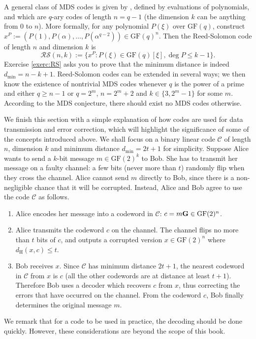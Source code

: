 \documentclass[a4paper, 11pt]{book}
\numberwithin{equation}{section}
\theoremstyle{plain}
\newcommand{\dmin}{d_{\min}}
\newcommand{\dH}{d_\mathrm{H}}
\newcommand{\GF}{\mathrm{GF}}
\renewcommand{\(}{\ldbrack}
\renewcommand{\)}{\rdbrack}
\newcommand{\BF}[1]{{\bf\boldmath{#1}\unboldmath}}
\begin{document}
A general class of MDS codes is given by \BF{Reed-Solomon codes}, defined by evaluations of polynomials, and which are $q$-ary codes of length $n = q-1$ (the dimension $k$ can be anything from $0$ to $n$). More formally, for any polynomial $P(\xi)$ over $\GF(q)$, construct $x^P := (P(1), P(\alpha), \dots, P(\alpha^{q-2})) \in \GF(q)^n$. Then the Reed-Solomon code of length $n$ and dimension $k$ is 
\[
	\mathcal{RS}(n,k) := \{ x^P : P(\xi) \in \GF(q)[\xi], \deg P \le k-1 \}.
\]
Exercise \ref{exerc:RS} asks you to prove that the minimum distance is indeed $\dmin = n - k + 1$. Reed-Solomon codes can be extended in several ways; we then know the existence of nontrivial MDS codes whenever $q$ is the power of a prime and either $q \ge n-1$ or $q = 2^m$, $n = 2^m+2$ and $k \in \{3,2^m-1\}$ for some $m$. According to the MDS conjecture, there should exist no MDS codes otherwise.



We finish this section with a simple explanation of how codes are used for data transmission and error correction, which will highlight the significance of some of the concepts introduced above. We shall focus on a binary linear code $\mathcal{C}$ of length $n$, dimension $k$ and minimum distance $\dmin = 2t+1$ for simplicity. Suppose Alice wants to send a $k$-bit message $m \in \GF(2)^k$ to Bob. She has to transmit her message on a faulty channel: a few bits (never more than $t$) randomly flip when they cross the channel. Alice cannot send $m$ directly to Bob, since there is a non-negligible chance that it will be corrupted. Instead, Alice and Bob agree to use the code $\mathcal{C}$ as follows.
\begin{enumerate}
	\item Alice encodes her message into a codeword in $\mathcal{C}$: $c = m {\bf G} \in \GF(2)^n$.
	
	\item Alice transmits the codeword $c$ on the channel. The channel flips no more than $t$ bits of $c$, and outputs a corrupted version $x \in \GF(2)^n$ where $\dH(x,c) \le t$.
	
	\item Bob receives $x$. Since $\mathcal{C}$ has minimum distance $2t+1$, the nearest codeword in $\mathcal{C}$ from $x$ is $c$ (all the other codewords are at distance at least $t+1$). Therefore Bob uses a decoder which recovers $c$ from $x$, thus correcting the errors that have occurred on the channel. From the codeword $c$, Bob finally determines the original message $m$. 
\end{enumerate}
We remark that for a code to be used in practice, the decoding should be done quickly. However, these considerations are beyond the scope of this book.
\end{document}
